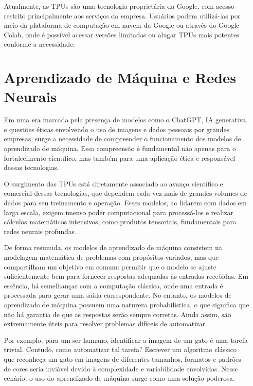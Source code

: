\documentclass{report}
\begin{document}
Atualmente, as TPUs são uma tecnologia proprietária da Google, com acesso restrito principalmente aos serviços da empresa. Usuários podem utilizá-las por meio da plataforma de computação em nuvem da Google ou através do Google Colab, onde é possível acessar versões limitadas ou alugar TPUs mais potentes conforme a necessidade.

\section{Aprendizado de Máquina e Redes Neurais}

Em uma era marcada pela presença de modelos como o ChatGPT, IA generativa, e questões éticas envolvendo o uso de imagens e dados pessoais por grandes empresas, surge a necessidade de compreender o funcionamento dos modelos de aprendizado de máquina. Essa compreensão é fundamental não apenas para o fortalecimento científico, mas também para uma aplicação ética e responsável dessas tecnologias.

O surgimento das TPUs está diretamente associado ao avanço científico e comercial dessas tecnologias, que dependem cada vez mais de grandes volumes de dados para seu treinamento e operação. Esses modelos, ao lidarem com dados em larga escala, exigem imenso poder computacional para processá-los e realizar cálculos matemáticos intensivos, como produtos tensoriais, fundamentais para redes neurais profundas.

De forma resumida, os modelos de aprendizado de máquina consistem na modelagem matemática de problemas com propósitos variados, mas que compartilham um objetivo em comum: permitir que o modelo se ajuste suficientemente bem para fornecer respostas adequadas às entradas recebidas. Em essência, há semelhanças com a computação clássica, onde uma entrada é processada para gerar uma saída correspondente. No entanto, os modelos de aprendizado de máquina possuem uma natureza probabilística, o que significa que não há garantia de que as respostas serão sempre corretas. Ainda assim, são extremamente úteis para resolver problemas difíceis de automatizar.

Por exemplo, para um ser humano, identificar a imagem de um gato é uma tarefa trivial. Contudo, como automatizar tal tarefa? Escrever um algoritmo clássico que reconheça um gato em imagens de diferentes tamanhos, formatos e padrões de cores seria inviável devido à complexidade e variabilidade envolvidas. Nesse cenário, o uso do aprendizado de máquina surge como uma solução poderosa.
\end{document}
